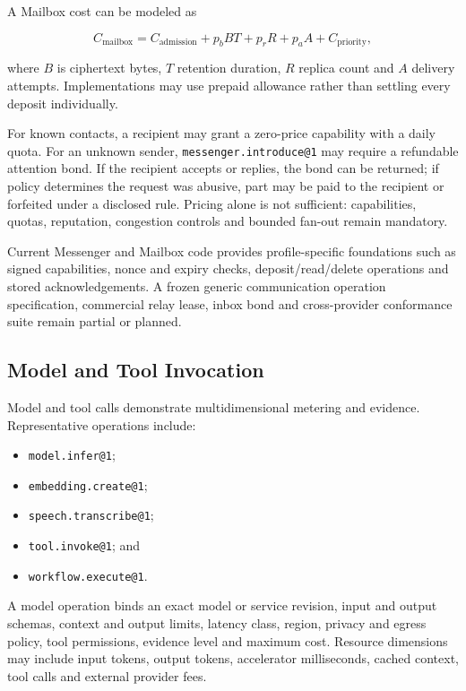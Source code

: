\documentclass[11pt,oneside]{article}
\newcommand{\opid}[1]{\texttt{#1}}
\begin{document}
A Mailbox cost can be modeled as

\[
  C_{\mathrm{mailbox}} =
  C_{\mathrm{admission}}
  + p_b B T
  + p_r R
  + p_a A
  + C_{\mathrm{priority}},
\]

where $B$ is ciphertext bytes, $T$ retention duration, $R$ replica count and $A$ delivery
attempts. Implementations may use prepaid allowance rather than settling every deposit
individually.

For known contacts, a recipient may grant a zero-price capability with a daily quota. For an
unknown sender, \opid{messenger.introduce@1} may require a refundable attention bond. If the
recipient accepts or replies, the bond can be returned; if policy determines the request was
abusive, part may be paid to the recipient or forfeited under a disclosed rule. Pricing alone
is not sufficient: capabilities, quotas, reputation, congestion controls and bounded fan-out
remain mandatory.

Current Messenger and Mailbox code provides profile-specific foundations such as signed
capabilities, nonce and expiry checks, deposit/read/delete operations and stored
acknowledgements. A frozen generic communication operation specification, commercial relay
lease, inbox bond and cross-provider conformance suite remain partial or planned.

\subsection{Model and Tool Invocation}

Model and tool calls demonstrate multidimensional metering and evidence. Representative
operations include:

\begin{itemize}
  \item \opid{model.infer@1};
  \item \opid{embedding.create@1};
  \item \opid{speech.transcribe@1};
  \item \opid{tool.invoke@1}; and
  \item \opid{workflow.execute@1}.
\end{itemize}

A model operation binds an exact model or service revision, input and output schemas, context
and output limits, latency class, region, privacy and egress policy, tool permissions,
evidence level and maximum cost. Resource dimensions may include input tokens, output tokens,
accelerator milliseconds, cached context, tool calls and external provider fees.
\end{document}
